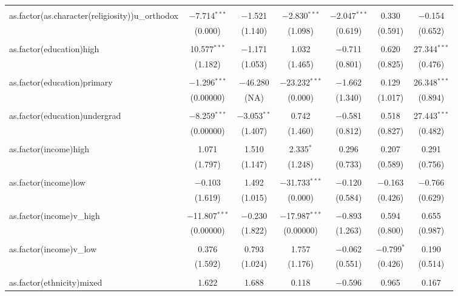 \documentclass[12pt,letterpaper]{article}
\begin{document}
\begin{table}[!htbp]
\begin{adjustbox}{max width=\textwidth}
\begin{tabular}{@{\extracolsep{5pt}}lcccccc}
		& & & & & & \\ 
		as.factor(as.character(religiosity))u\_orthodox & $-$7.714$^{***}$ & $-$1.521 & $-$2.830$^{***}$ & $-$2.047$^{***}$ & 0.330 & $-$0.154 \\ 
		& (0.000) & (1.140) & (1.098) & (0.619) & (0.591) & (0.652) \\ 
		& & & & & & \\ 
		as.factor(education)high & 10.577$^{***}$ & $-$1.171 & 1.032 & $-$0.711 & 0.620 & 27.344$^{***}$ \\ 
		& (1.182) & (1.053) & (1.465) & (0.801) & (0.825) & (0.476) \\ 
		& & & & & & \\ 
		as.factor(education)primary & $-$1.296$^{***}$ & $-$46.280 & $-$23.232$^{***}$ & $-$1.662 & 0.129 & 26.348$^{***}$ \\ 
		& (0.00000) & (NA) & (0.000) & (1.340) & (1.017) & (0.894) \\ 
		& & & & & & \\ 
		as.factor(education)undergrad & $-$8.259$^{***}$ & $-$3.053$^{**}$ & 0.742 & $-$0.581 & 0.518 & 27.443$^{***}$ \\ 
		& (0.00000) & (1.407) & (1.460) & (0.812) & (0.827) & (0.482) \\ 
		& & & & & & \\ 
		as.factor(income)high & 1.071 & 1.510 & 2.335$^{*}$ & 0.296 & 0.207 & 0.291 \\ 
		& (1.797) & (1.147) & (1.248) & (0.733) & (0.589) & (0.756) \\ 
		& & & & & & \\ 
		as.factor(income)low & $-$0.103 & 1.492 & $-$31.733$^{***}$ & $-$0.120 & $-$0.163 & $-$0.766 \\ 
		& (1.619) & (1.015) & (0.000) & (0.584) & (0.426) & (0.629) \\ 
		& & & & & & \\ 
		as.factor(income)v\_high & $-$11.807$^{***}$ & $-$0.230 & $-$17.987$^{***}$ & $-$0.893 & 0.594 & 0.655 \\ 
		& (0.00000) & (1.822) & (0.00000) & (1.263) & (0.800) & (0.987) \\ 
		& & & & & & \\ 
		as.factor(income)v\_low & 0.376 & 0.793 & 1.757 & $-$0.062 & $-$0.799$^{*}$ & 0.190 \\ 
		& (1.592) & (1.024) & (1.176) & (0.551) & (0.426) & (0.514) \\ 
		& & & & & & \\ 
		as.factor(ethnicity)mixed & 1.622 & 1.688 & 0.118 & $-$0.596 & 0.965 & 0.167 \\ 

\end{tabular}
\end{adjustbox}
\end{table}
\end{document}
